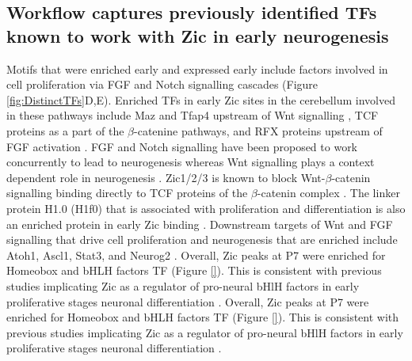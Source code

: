 \documentclass[fleqn,10pt,twocolumn]{wlscirep}
\begin{document}
\subsection*{Workflow captures previously identified TFs known to work with Zic in early neurogenesis}
Motifs that were enriched early and expressed early include factors involved in cell proliferation via FGF and Notch signalling cascades (Figure \ref{fig:DistinctTFs}D,E). Enriched TFs in early Zic sites in the cerebellum involved in these pathways include  Maz and Tfap4 upstream of Wnt signalling \cite{Martinez2020TheDevelopment, Song2018TranscriptionCarcinoma}, TCF proteins as a part of the $\beta$-catenine pathways, and RFX proteins upstream of FGF activation \cite{Hsu2010RegulationRFX1}. FGF and Notch signalling have been proposed to work concurrently to lead to neurogenesis \cite{Voelkel2014FGFHierarchy} whereas Wnt signalling plays a context dependent role in neurogenesis \cite{Lassiter2014SignalingDelamination}. Zic1/2/3 is known to block Wnt-$\beta$-catenin signalling binding directly to TCF proteins of the $\beta$-catenin complex \cite{Ge2020Zic1Transition, Fujimi2012XenopusPathway, Murgan2015AtypicalPrecursors, Pourebrahim2011TranscriptionSignaling, Aruga2018ZicDisease,Aruga2018Zic1,Lowenstein2021Olig3Development}. The linker protein H1.0 (H1f0) that is associated with proliferation and differentiation is also an enriched protein in early Zic binding \cite{DiLiegro2018H1.0Differentiation}. Downstream targets of Wnt and FGF signalling that drive cell proliferation and neurogenesis that are enriched include Atoh1, Ascl1, Stat3, and Neurog2 \cite{Dennis2019BHLHReprogramming}. Overall, Zic peaks at P7 were enriched for Homeobox and bHLH factors TF (Figure \ref{}). This is consistent with previous studies implicating Zic as a regulator of pro-neural bHlH factors in early proliferative stages neuronal differentiation \cite{Aruga2018ZicDisease}. Overall, Zic peaks at P7 were enriched for Homeobox and bHLH factors TF (Figure \ref{}). This is consistent with previous studies implicating Zic as a regulator of pro-neural bHlH factors in early proliferative stages neuronal differentiation \cite{Aruga2018ZicDisease}. 
\end{document}
